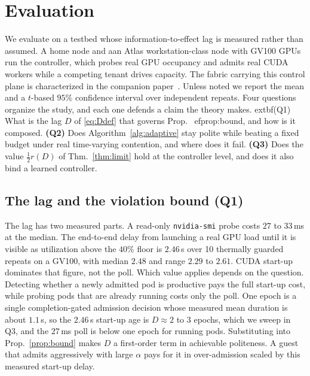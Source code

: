 \section{Evaluation}
\label{sec:eval}

We evaluate on a testbed whose information-to-effect lag is measured rather than assumed. A home
node and \ifblind a\else an Atlas\fi{} workstation-class node with GV100 GPUs run
the controller, which probes real GPU occupancy and admits real CUDA workers while
a competing tenant drives capacity. The fabric carrying this control plane is
characterized in the companion paper~\cite{companion}. Unless noted we report the
mean and a $t$-based $95\%$ confidence interval over independent repeats. Four
questions organize the study, and each one defends a claim the theory makes.
	extbf{(Q1)} What is the lag $D$ of \eqref{eq:Ddef} that governs
Prop.~
ef{prop:bound}, and how is it composed. \textbf{(Q2)} Does Algorithm~\ref{alg:adaptive} stay
polite while beating a fixed budget under real time-varying contention, and where
does it fail. \textbf{(Q3)} Does the value $\tfrac12 r(D)$ of Thm.~\ref{thm:limit}
hold at the controller level, and does it also bind a learned controller.

\subsection{The lag and the violation bound (Q1)}
\label{sec:eval-detection}
The lag has two measured parts. A read-only \texttt{nvidia-smi} probe
costs $27$ to $33$\,ms at the median. The end-to-end delay from launching a real
GPU load until it is visible as utilization above the $40\%$ floor is
$\mathbf{2.46}$\,s over 10 thermally guarded repeats on a GV100, with median
$2.48$ and range $2.29$ to $2.61$. CUDA start-up dominates that figure, not the
poll. Which value applies depends on the question. Detecting whether a newly
admitted pod is productive pays the full start-up cost, while probing pods that
are already running costs only the poll. One epoch is a single completion-gated
admission decision whose measured mean duration is about $1.1$\,s, so the
$2.46$\,s start-up age is $D\approx2$ to $3$ epochs, which we sweep in Q3, and
the $27$\,ms poll is below one epoch for running pods. Substituting into
Prop.~\ref{prop:bound} makes $D$ a first-order term in achievable politeness. A
guest that admits aggressively with large $\alpha$ pays for it in over-admission
scaled by this measured start-up delay.

